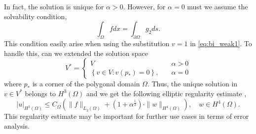  In fact, the solution is unique for $\alpha  > 0$. However, for $\alpha  = 0$ must we assume the solvability condition,
\begin{equation*}
 \int_{\Omega }^{} f dx = \int_{\partial \Omega }^{} g_{2} ds
.\end{equation*}
This condition easily arise when using the substitution $v=1$ in \eqref{eq:bi_weak1}. To handle this, can we extended the solution space \[
V^{*} = \begin{cases}
    V \quad & \alpha  > 0 \\
    \left\{ v \in V: v\left( p_{*} \right)  = 0\right\}, \quad & \alpha  = 0
\end{cases}
\]
where $p_{*}$ is a corner of the polygonal domain $\Omega $.
Thus, the unique solution in $v \in V^{*}$ belongs to $H^{3 }\left( \Omega  \right) $ and we get the following
elliptic regularity estimate \cite{gu2012c0},
\begin{equation}
\label{eq:bi_harmonic_ellitpic_regularity}
\left| u \right| _{H^{3 }\left( \Omega  \right) }  \le C_{\Omega } \left( \| f \|_{  L_{2}( \Omega ) }^{  } + ( 1 + \alpha  ^{\frac{1}{2}}
) \cdot \| w  \|_{ H^{4}\left( \Omega  \right)  }^{  }    \right), \quad w\in H^{4}\left( \Omega  \right).
\end{equation}
This regularity estimate may be important for further use cases in terms of error analysis.

